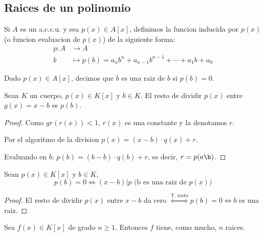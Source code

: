 \subsection{Raices de un polinomio}
\begin{definition}
	Si \(A \) es un a.c.c.u. y sea \(p(x) \in A[x ]\), definimos la funcion inducida por \(p(x )\) (o funcion evaluacion de \(p(x )\)) de la siguiente forma:
	\[
		\begin{aligned}
			p \colon A & \longrightarrow A                                                        \\
			b          & \longmapsto p (b ) = a_n b^{n} + a_{n-1} b^{n-1} + \cdots + a_1 b + a_0
		\end{aligned}
	\]
	
\end{definition}
\begin{definition}
	Dado \(p(x) \in A [x]\), decimos que \(b \) es una raiz de \(b\) si \(p(b) = 0 \).
\end{definition}
\begin{theorem}
	Sean \(K \) un cuerpo, \(p(x) \in K[x ]\) y \(b \in K \). El resto de dividir \(p(x )\) entre \(g(x) = x - b \) es \(p(b )\).
\end{theorem}
\begin{proof}
	Como \(gr(r(x )) < 1 \), \( r(x)\) es una constante y la denotamos \(r \).
	
	Por el algoritmo de la division \(p(x) = (x - b) \cdot q(x) + r \).
	
	Evaluando en \(b \): \(p(b) = (b - b) \cdot q(b) + r \), es decir, \(r = p(a\b )\).
\end{proof}
\begin{corollary}
	Sean \(p(x) \in K[x ]\) y \(b \in K \),
	\[
		p(b) = 0 \iff (x-b)|p \text{ (b es una raiz de } p(x))
	\]
\end{corollary}
\begin{proof}
	El resto de dividir \(p(x )\) entre \(x - b \) da cero \(\overset{\text{T. resto} }{\iff } p(b) = 0 \iff b \) es una raiz.
\end{proof}
\begin{corollary}
	\label{raices}
	Sea \(f(x) \in K[x ]\) de grado \(n \geq  1 \). Entonces \(f\) tiene, como mucho, \(n \) raices.
\end{corollary}
